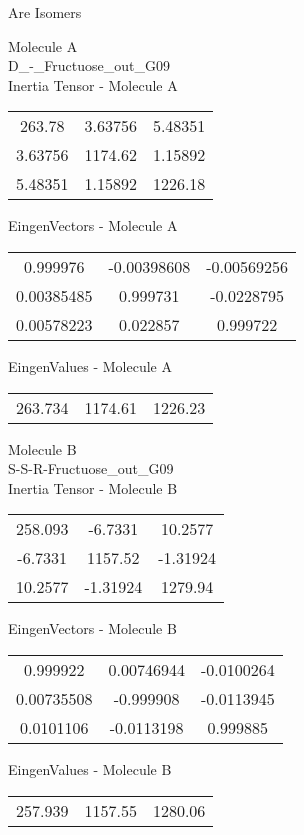 \begin{center}
\vtab
\vtab
\textcolor{NavyBlue}{\Large Are Isomers}
\end{center}
\newpage
\begin{multicols}{2}
\begin{center}
Molecule A \\ 
D\_-\_Fructuose\_out\_G09
\\
Inertia Tensor - Molecule A \\
\vtab
\begin{tabular}{|c c c|}
263.78	 & 	3.63756	 & 	5.48351	 \\
3.63756	 & 	1174.62	 & 	1.15892	 \\
5.48351	 & 	1.15892	 & 	1226.18
\end{tabular}

\vtab
 EingenVectors - Molecule A     \\
\vtab
\begin{tabular}{|c c c|}
0.999976	 & 	-0.00398608	 & 	-0.00569256	 \\
0.00385485	 & 	0.999731	 & 	-0.0228795	 \\
0.00578223	 & 	0.022857	 & 	0.999722
\end{tabular}

\vtab
 EingenValues - Molecule A     \\
\vtab
\begin{tabular}{|c c c|}
263.734	 & 	1174.61	 & 	1226.23
\end{tabular}
\columnbreak

Molecule B \\ 
S-S-R-Fructuose\_out\_G09
\\
Inertia Tensor - Molecule B \\
\vtab
\begin{tabular}{|c c c|}
258.093	 & 	-6.7331	 & 	10.2577	 \\
-6.7331	 & 	1157.52	 & 	-1.31924	 \\
10.2577	 & 	-1.31924	 & 	1279.94
\end{tabular}

\vtab
 EingenVectors - Molecule B     \\
\vtab
\begin{tabular}{|c c c|}
0.999922	 & 	0.00746944	 & 	-0.0100264	 \\
0.00735508	 & 	-0.999908	 & 	-0.0113945	 \\
0.0101106	 & 	-0.0113198	 & 	0.999885
\end{tabular}

\vtab
 EingenValues - Molecule B     \\
\vtab
\begin{tabular}{|c c c|}
257.939	 & 	1157.55	 & 	1280.06
\end{tabular}

\end{center}
\end{multicols}
